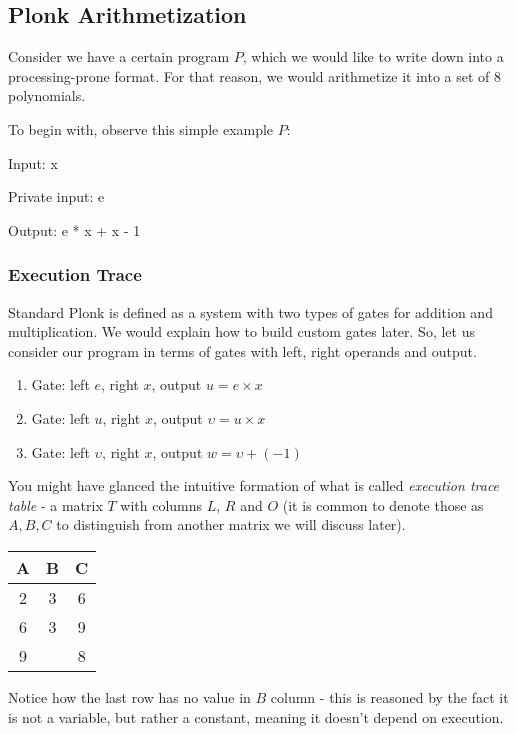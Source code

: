 \documentclass[../lecture-notes.tex]{subfiles}
\begin{document}
\subsection{Plonk Arithmetization}

Consider we have a certain program $P$, which we would like to write down into a processing-prone format. For that reason, we would arithmetize it into a set of 8 polynomials.

\begin{example}
To begin with, observe this simple example $P$:

\begin{center}
Input: x

Private input: e

Output: e * x + x - 1
\end{center}
\end{example}

\subsubsection{Execution Trace}

Standard Plonk is defined as a system with two types of gates for addition and multiplication. We would explain how to build custom gates later.
So, let us consider our program in terms of gates with left, right operands and output. 

\begin{example}
    \begin{enumerate}
        \item Gate: left $e$, right $x$, output \(u = e \times x\)
        \item Gate: left $u$, right $x$, output \(\upsilon = u \times x\)
        \item Gate: left $\upsilon$, right $x$, output \(w = \upsilon + (-1)\)
    \end{enumerate}
\end{example}

You might have glanced the intuitive formation of what is called \textit{execution trace table} - a matrix $T$ with columns $L$, $R$ and $O$ (it is common to denote those as $A, B, C$ to distinguish from another matrix we will discuss later).

\begin{example}
\begin{center}
\begin{tabular}{|c|c|c|}
\hline
A & B & C \\ \hline
2 & 3 & 6 \\ \hline
6 & 3 & 9 \\ \hline
9 &  & 8 \\ \hline
\end{tabular}
\end{center}

Notice how the last row has no value in $B$ column - this is reasoned by the fact it is not a variable, but rather a constant, meaning it doesn't depend on execution.
\end{example}
\end{document}
